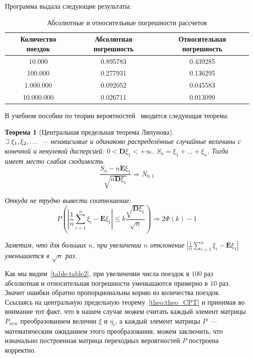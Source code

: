 \documentclass[specialist, substylefile = spbu_report.rtx, subf,href,colorlinks=true, 12pt]{disser}
\newtheorem{theorem}{Теорема}
\def\letus{%
	\mathord{\setbox0=\hbox{$\exists$}%
		\hbox{\kern 0.125\wd0%
			\vbox to \ht0{%
				\hrule width 0.75\wd0%
				\vfill%
				\hrule width 0.75\wd0}%
			\vrule height \ht0%
			\kern 0.125\wd0}%
	}%
}
\begin{document}
Программа выдала следующие результаты:

\begin{table}[h]
	\begin{center}
		\begin{tabular}{|c|c|c|}
			\hline
   			Количество поездок		& Абсолютная погрешность	& Относительная погрешность  \\ \hline
			10.000 & 0.895783 & 0.439285 \\ \hline
			100.000 & 0.277931 & 0.136295 \\ \hline
			1.000.000 & 0.092052 & 0.045583 \\ \hline
			10.000.000 & 0.026711 & 0.013099 \\ \hline
		\end{tabular}
	\end{center}
	\caption{Абсолютные и относительные погрешности рассчетов}\label{table:table2}
\end{table}

В учебном пособии по теории вероятностей~\cite[Гл. 8]{Chernova} вводится следующая теорема: 
\begin{theorem}[Центральная предельная теорема Ляпунова]\label{theo:theo_CPT}
	 \\
	$\letus \ \xi_1, \xi_2,\ldots$~--- независимые и одинаково распределённые случайные величины с конечной и ненулевой дисперсией: $0 < \mathbf{D}\xi_1 < +\infty$. $S_n = \xi_1 + \ldots + \xi_n$. Тогда имеет место слабая сходимость
	\begin{equation}
		\frac{S_n - n \mathbf{E}\xi_1}{\sqrt{n \mathbf{D}\xi_1}} \Rightarrow N_{0, 1}
	\end{equation}
	
	Откуда не трудно вывести соотношение:
	\begin{equation}
		P \left( \left| \frac{1}{n} \sum\limits_{i = 1}^n{\xi_i} - \mathbf{E}\xi_1 \right| \leq k \frac{\sqrt{\mathbf{D}\xi_1}}{\sqrt{n}} \right) \Rightarrow 2\Phi(k) - 1
	\end{equation}
	
	Заметим, что для больших $n$, при увеличении $n$ отклонение $\left| \frac{1}{n} \sum\limits_{i = 1}^n{\xi_i} - \mathbf{E}\xi_1 \right|$ уменьшается в $\sqrt{n}$ раз.
\end{theorem}

Как мы видим~\eqref{table:table2}, при увеличении числа поездок в $100$ раз абсолютная и относительная погрешности уменьшаются примерно в $10$ раз. Значит ошибки обратно пропорциональны корню из количества поездок. Ссылаясь на центральную предельную теорему~\eqref{theo:theo_CPT} и принимая во внимание тот факт, что в нашем случае можем считать каждый элемент матрицы $P_{new}$ преобразованием величин $\xi$ и $\eta_i$, а каждый элемент матрицы $P$~--- математическим ожиданием этого преобразования, можем заключить, что изначально построенная матрица переходных вероятностей $P$ построена корректно.
\end{document}
